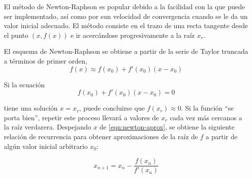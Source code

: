 El método de Newton-Raphson es popular debido a la facilidad con la que puede
ser implementado, así como por sun velocidad de convergencia cuando se le da un
valor inicial adecuado. El método consiste en el trazo de una recta tangente
desde el punto $(x, f(x))$ e ir acercándose progresivamente a la raíz $x_r$.

El esquema de Newton-Raphson se obtiene a partir de la serie de Taylor truncada
a términos de primer orden,
\[
    f(x) \approx f(x_0) + f'(x_0)(x - x_0)
\]

Si la ecuación
\begin{equation}
    f(x_0) + f'(x_0) (x - x_0) = 0 \label{eqn:newton-aprox}
\end{equation}

\noindent tiene una solución $x = x_r$, puede concluirse que $f(x_r) \approx
0$. Si la función ``se porta bien'', repetir este proceso llevará a valores de
$x_r$ cada vez más cercanos a la raíz verdarera. Despejando $x$ de
\ref{eqn:newton-aprox}, se obtiene la siguiente relación de recurrencia para
obtener aproximaciones de la raíz de $f$ a partir de algún valor inicial
arbitrario $x_0$:

\begin{equation}\label{eqn:newton}
    \boxed{x_{n+1} = x_n - \frac{f(x_n)}{f'(x_n)}}
\end{equation}

